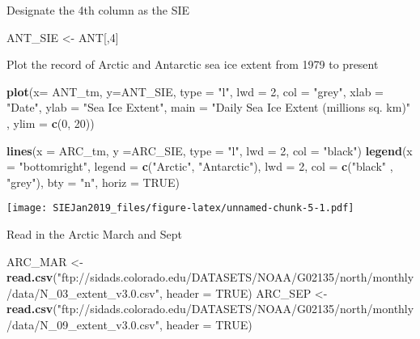 \documentclass[]{article}
\newenvironment{Shaded}{\begin{snugshade}}{\end{snugshade}}
\newcommand{\KeywordTok}[1]{\textcolor[rgb]{0.13,0.29,0.53}{\textbf{#1}}}
\newcommand{\DataTypeTok}[1]{\textcolor[rgb]{0.13,0.29,0.53}{#1}}
\newcommand{\DecValTok}[1]{\textcolor[rgb]{0.00,0.00,0.81}{#1}}
\newcommand{\StringTok}[1]{\textcolor[rgb]{0.31,0.60,0.02}{#1}}
\newcommand{\OtherTok}[1]{\textcolor[rgb]{0.56,0.35,0.01}{#1}}
\newcommand{\NormalTok}[1]{#1}
\begin{document}
Designate the 4th column as the SIE

\begin{Shaded}
\begin{Highlighting}[]
\NormalTok{ANT_SIE <-}\StringTok{ }\NormalTok{ANT[,}\DecValTok{4}\NormalTok{]}
\end{Highlighting}
\end{Shaded}

Plot the record of Arctic and Antarctic sea ice extent from 1979 to
present

\begin{Shaded}
\begin{Highlighting}[]
\KeywordTok{plot}\NormalTok{(}\DataTypeTok{x=}\NormalTok{ ANT_tm, }\DataTypeTok{y=}\NormalTok{ANT_SIE, }\DataTypeTok{type =} \StringTok{"l"}\NormalTok{, }\DataTypeTok{lwd =} \DecValTok{2}\NormalTok{, }\DataTypeTok{col =} \StringTok{"grey"}\NormalTok{, }\DataTypeTok{xlab =} \StringTok{"Date"}\NormalTok{, }\DataTypeTok{ylab =} \StringTok{"Sea Ice Extent"}\NormalTok{, }\DataTypeTok{main =} \StringTok{"Daily Sea Ice Extent (millions sq. km)"}\NormalTok{ , }\DataTypeTok{ylim =} \KeywordTok{c}\NormalTok{(}\DecValTok{0}\NormalTok{, }\DecValTok{20}\NormalTok{))}

\KeywordTok{lines}\NormalTok{(}\DataTypeTok{x =}\NormalTok{ ARC_tm, }\DataTypeTok{y =}\NormalTok{ARC_SIE, }\DataTypeTok{type =} \StringTok{"l"}\NormalTok{, }\DataTypeTok{lwd =} \DecValTok{2}\NormalTok{, }\DataTypeTok{col =} \StringTok{"black"}\NormalTok{)}
\KeywordTok{legend}\NormalTok{(}\DataTypeTok{x =} \StringTok{"bottomright"}\NormalTok{, }\DataTypeTok{legend =} \KeywordTok{c}\NormalTok{(}\StringTok{"Arctic"}\NormalTok{, }\StringTok{"Antarctic"}\NormalTok{), }\DataTypeTok{lwd =} \DecValTok{2}\NormalTok{, }\DataTypeTok{col =} \KeywordTok{c}\NormalTok{(}\StringTok{"black"}\NormalTok{ , }\StringTok{"grey"}\NormalTok{), }\DataTypeTok{bty =} \StringTok{"n"}\NormalTok{, }\DataTypeTok{horiz =} \OtherTok{TRUE}\NormalTok{)}
\end{Highlighting}
\end{Shaded}

\texttt{[image: SIEJan2019\_files/figure-latex/unnamed-chunk-5-1.pdf]}

Read in the Arctic March and Sept

\begin{Shaded}
\begin{Highlighting}[]
\NormalTok{ARC_MAR <-}\StringTok{ }\KeywordTok{read.csv}\NormalTok{(}\StringTok{"ftp://sidads.colorado.edu/DATASETS/NOAA/G02135/north/monthly/data/N_03_extent_v3.0.csv"}\NormalTok{, }\DataTypeTok{header =} \OtherTok{TRUE}\NormalTok{)}
\NormalTok{ARC_SEP <-}\StringTok{ }\KeywordTok{read.csv}\NormalTok{(}\StringTok{"ftp://sidads.colorado.edu/DATASETS/NOAA/G02135/north/monthly/data/N_09_extent_v3.0.csv"}\NormalTok{, }\DataTypeTok{header =} \OtherTok{TRUE}\NormalTok{)}
\end{Highlighting}
\end{Shaded}
\end{document}
